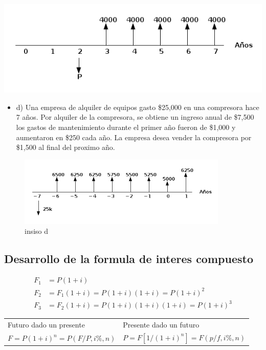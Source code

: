 \documentclass[11pt]{article}
\begin{document}
\begin{center}
\includegraphics[width=.9\linewidth]{img/incisoc.png}
\end{center}


\begin{itemize}
\item d) Una empresa de alquiler de equipos gasto \$25,000 en una compresora hace 7 años. Por alquiler de la compresora, se obtiene un ingreso anual de \$7,500 los gastos de mantenimiento durante el primer año fueron de \$1,000 y aumentaron en \$250 cada año. La empresa desea vender la compresora por \$1,500 al final del proximo año.
\end{itemize}

\begin{figure}[htbp]
\centering
\includegraphics[width=10cm]{img/incisod.png}
\caption{insiso d}
\end{figure}

\subsection*{Desarrollo de la formula de interes compuesto}
\label{sec:orgec89424}
\begin{mdframed}
\[ \begin{aligned}
F_1 &= P(1+i) \\
F_2 &= F_1(1+i) = P(1+i)(1+i) = P(1+i)^2 \\
F_3 &= F_2(1+i) = P(1+i)(1+i)(1+i) = P(1+i)^3 
\end{aligned} \]

\begin{center}
\begin{tabular}{ll}
Futuro dado un presente & Presente dado un futuro\\
\(F = P(1+i)^n = P(F/P, i\%, n)\) & \(P = F \left[1/(1+i)^n\right] = F(p/f, i\%,n)\)\\
\end{tabular}

\end{center}
\end{mdframed}
\end{document}
